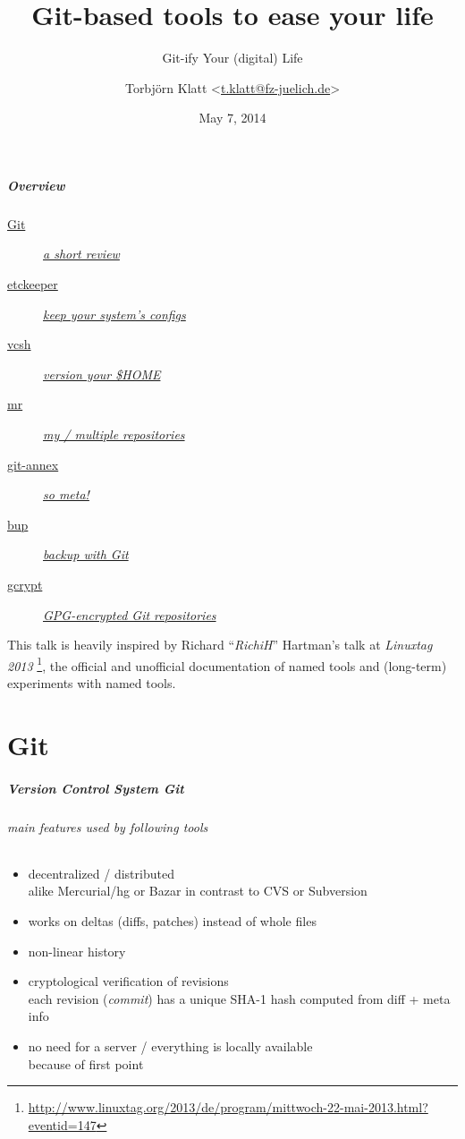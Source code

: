 \documentclass[english,hyperref={pdfpagelabels=false},aspectratio=1610]{beamer}
\title{Git-based tools to ease your life}
\subtitle{Git-ify Your (digital) Life}
\author{Torbjörn Klatt <\href{mailto:t.klatt@fz-juelich.de}{t.klatt@fz-juelich.de}>}
\institute{JSC Internal Seminar}
\date{May 7, 2014}
\begin{document}
\maketitle

\begin{frame}
  \frametitle{Overview}
  \begin{description}
    \item[\hyperlink{git}{Git}] \hyperlink{git}{\textit{a short review}}
    \item[\hyperlink{etckeeper}{etckeeper}] \hyperlink{etckeeper}{\textit{keep your system's configs}}
    \item[\hyperlink{vcsh}{vcsh}] \hyperlink{vcsh}{\textit{version your \$HOME}}
    \item[\hyperlink{mr}{mr}] \hyperlink{mr}{\textit{my / multiple repositories}}
    \item[\hyperlink{gitannex}{git-annex}] \hyperlink{gitannex}{\textit{so meta!}}
    \item[\hyperlink{bup}{bup}] \hyperlink{bup}{\textit{backup with Git}}
    \item[\hyperlink{gcrypt}{gcrypt}] \hyperlink{gcrypt}{\textit{GPG-encrypted Git repositories}}
  \end{description}
  \vfill
  \bigskip
  \vfill
  \scriptsize
  This talk is heavily inspired by Richard ``\textit{RichiH}'' Hartman's talk at \textit{Linuxtag 2013}
  \footnote{\tiny\url{http://www.linuxtag.org/2013/de/program/mittwoch-22-mai-2013.html?eventid=147}}, the official and unofficial documentation of named tools and (long-term) experiments with named tools.
\end{frame}


\part{Git}
\makepart

\begin{frame}[label=git]
  \frametitle{Version Control System \textit{Git}}
  \framesubtitle{main features used by following tools}
  \begin{itemize}
    \item decentralized / distributed\\
      {\scriptsize alike Mercurial/hg or Bazar in contrast to CVS or Subversion}
    \item works on deltas {\scriptsize\color{fzjgray50}(diffs, patches)} instead of whole files
    \item non-linear history
    \item cryptological verification of revisions\\
      {\scriptsize each revision (\textit{commit}) has a unique SHA-1 hash computed from diff + meta info}
    \item no need for a server / everything is locally available\\
      {\scriptsize because of first point}
  \end{itemize}
\end{frame}
\end{document}
